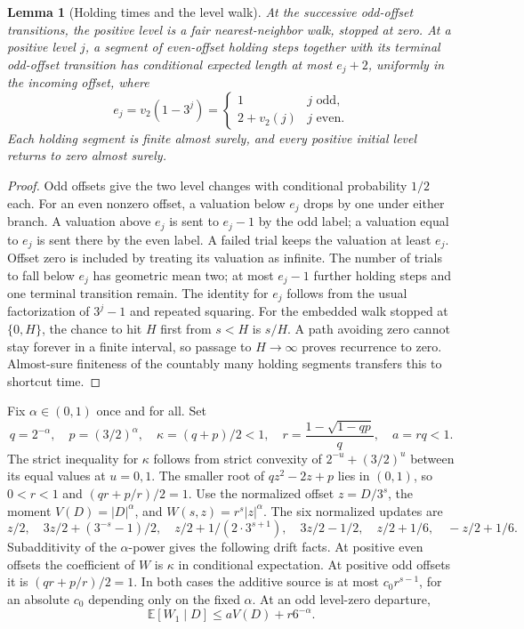 \documentclass[11pt]{amsart}
\newtheorem{lemma}[theorem]{Lemma}
\theoremstyle{definition}
\theoremstyle{remark}
\newcommand{\E}{\mathbb E}
\begin{document}
\begin{lemma}[Holding times and the level walk]\label{lem:holding}
At the successive odd-offset transitions, the positive level is a fair nearest-neighbor walk, stopped at zero. At a positive level $j$, a segment of even-offset holding steps together with its terminal odd-offset transition has conditional expected length at most $e_j+2$, uniformly in the incoming offset, where
\[
 e_j=v_2(1-3^j)=\begin{cases}1&j\text{ odd},\\2+v_2(j)&j\text{ even}.\end{cases}
\]
Each holding segment is finite almost surely, and every positive initial level returns to zero almost surely.
\end{lemma}
\begin{proof}
Odd offsets give the two level changes with conditional probability $1/2$ each. For an even nonzero offset, a valuation below $e_j$ drops by one under either branch. A valuation above $e_j$ is sent to $e_j-1$ by the odd label; a valuation equal to $e_j$ is sent there by the even label. A failed trial keeps the valuation at least $e_j$. Offset zero is included by treating its valuation as infinite. The number of trials to fall below $e_j$ has geometric mean two; at most $e_j-1$ further holding steps and one terminal transition remain. The identity for $e_j$ follows from the usual factorization of $3^j-1$ and repeated squaring.
For the embedded walk stopped at $\{0,H\}$, the chance to hit $H$ first from $s<H$ is $s/H$. A path avoiding zero cannot stay forever in a finite interval, so passage to $H\to\infty$ proves recurrence to zero. Almost-sure finiteness of the countably many holding segments transfers this to shortcut time.
\end{proof}

Fix $\alpha\in(0,1)$ once and for all. Set
\[
 q=2^{-\alpha},\quad p=(3/2)^\alpha,\quad
 \kappa=(q+p)/2<1,\quad
 r=\frac{1-\sqrt{1-qp}}q,\quad a=rq<1.
\]
The strict inequality for $\kappa$ follows from strict convexity of
$2^{-u}+(3/2)^u$ between its equal values at $u=0,1$. The smaller root of $qz^2-2z+p$ lies in $(0,1)$, so $0<r<1$ and $(qr+p/r)/2=1$.
Use the normalized offset $z=D/3^s$, the moment $V(D)=|D|^\alpha$, and $W(s,z)=r^s|z|^\alpha$.
The six normalized updates are
\[
 z/2,\quad 3z/2+(3^{-s}-1)/2,\quad
 z/2+1/(2\cdot3^{s+1}),\quad 3z/2-1/2,\quad
 z/2+1/6,\quad -z/2+1/6.
\]
Subadditivity of the $\alpha$-power gives the following drift facts. At positive even offsets the coefficient of $W$ is $\kappa$ in conditional expectation. At positive odd offsets it is $(qr+p/r)/2=1$. In both cases the additive source is at most $c_0r^{s-1}$, for an absolute $c_0$ depending only on the fixed $\alpha$. At an odd level-zero departure,
\begin{equation}\label{eq:departure}
 \E[W_1\mid D]\le aV(D)+r6^{-\alpha}.
\end{equation}
\end{document}
